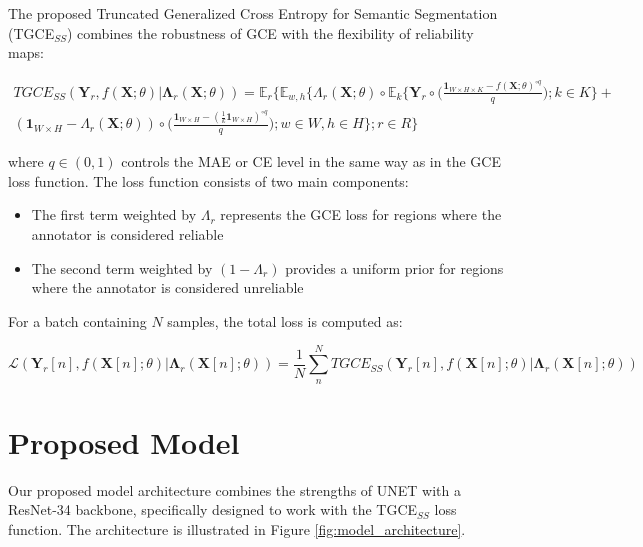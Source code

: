 The proposed Truncated Generalized Cross Entropy for Semantic
Segmentation (TGCE$_{SS}$) combines the robustness of GCE with the
flexibility of reliability maps:

\begin{equation}
  \begin{split}
    TGCE_{SS}(\mathbf{Y}_r,f(\mathbf X;\theta) | \mathbf{\Lambda}_r
    (\mathbf X;\theta)) = \mathbb E_{r} \Bigg\{ \mathbb E_{w,h}
      \Bigg\{ \Lambda_r (\mathbf X; \theta) \circ \mathbb E_k \bigg\{
          \mathbf Y_r \circ \bigg( \frac{\mathbf 1 _{W\times H \times
        K} - f(\mathbf X;\theta) ^{\circ q }}{q} \bigg); k \in K  \bigg\}  + \\
        \left(\mathbf 1 _{W \times H } - \Lambda _r (\mathbf
        X;\theta)\right) \circ \bigg(   \frac{\mathbf 1_{W\times H} -
        (\frac {1}{k} \mathbf 1_{W\times H})^{\circ q}}{q} \bigg); w \in
    W, h \in H \Bigg\};r\in R\Bigg\}
  \end{split}
\end{equation}

where $q \in (0,1)$ controls the \gls{MAE} or \gls{CE} level in the
same way as in the \gls{GCE} loss function. The loss function consists of
two main components:

\begin{itemize}
  \item The first term weighted by $\Lambda_r$ represents the GCE
    loss for regions where the annotator is considered reliable
  \item The second term weighted by $(1-\Lambda_r)$ provides a
    uniform prior for regions where the annotator is considered unreliable
\end{itemize}

For a batch containing $N$ samples, the total loss is computed as:

\begin{equation}
  \mathscr{L}\left(\mathbf{Y}_r[n],f(\mathbf X[n];\theta) |
  \mathbf{\Lambda}_r (\mathbf X[n];\theta)\right)  = \frac{1}{N}
  \sum_{n}^N TGCE_{SS}(\mathbf{Y}_r[n],f(\mathbf X[n];\theta) |
  \mathbf{\Lambda}_r (\mathbf X[n];\theta))
\end{equation}

\section{Proposed Model}

Our proposed model architecture combines the strengths of UNET with a
ResNet-34 backbone, specifically designed to work with the
TGCE$_{SS}$ loss function. The architecture is illustrated in Figure
\ref{fig:model_architecture}.

